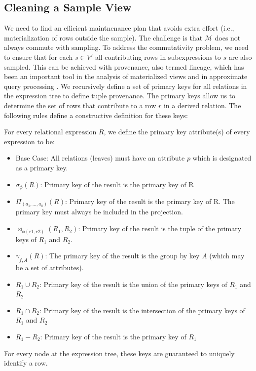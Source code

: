 \subsection{Cleaning a Sample View}
We need to find an efficient maintnenance plan that avoids extra effort (i.e., materialization of rows outside the sample).
The challenge is that $\mathcal{M}$ does not always commute with sampling.
To address the commutativity problem, we need to ensure that for each $s \in V'$ all contributing rows in subexpressions to $s$ are also sampled. 
This can be achieved with provenance, also termed lineage, which has been an important tool in the analysis of materialized views \cite{DBLP:journals/vldb/CuiW03} and in approximate query processing \cite{DBLP:conf/sigmod/ZengGMZ14}. We recursively define a set of primary keys for all relations in the expression tree to define tuple provenance.
The primary keys allow us to determine the set of rows that contribute to a row $r$ in a derived relation.
The following rules define a constructive definition for these keys: 
\begin{definition} \label{pk}
For every relational expression $R$, we define the primary key attribute(s) of every expression to be:
\begin{itemize}[noitemsep]
\item Base Case: All relations (leaves) must have an attribute $p$ which is designated as a primary key. 
\item $\sigma_{\phi}(R)$: Primary key of the result is the primary key of R 
\item $\Pi_{(a_1,...,a_k)}(R)$: Primary key of the result is the primary key of R. The primary key must always be included in the projection.
\item $\bowtie_{\phi (r1,r2)}(R_1,R_2)$: Primary key of the result is the tuple of the primary keys of $R_1$ and $R_2$. 
\item $\gamma_{f,A}(R)$: The primary key of the result is the group by key $A$ (which may be a set of attributes).
\item $R_1 \cup R_2$: Primary key of the result is the union of the primary keys of $R_1$ and $R_2$
\item $R_1 \cap R_2$: Primary key of the result is the intersection of the primary keys of $R_1$ and $R_2$
\item $R_1 - R_2$: Primary key of the result is the primary key of $R_1$
\end{itemize}
For every node at the expression tree, these keys are guaranteed to uniquely identify a row.
\end{definition}

